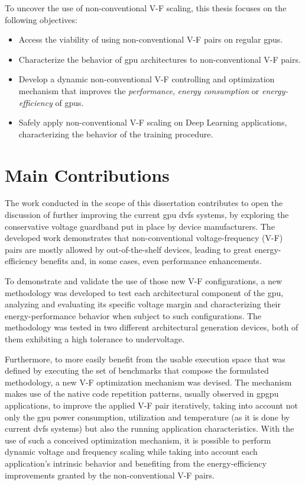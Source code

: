 To uncover the use of non-conventional V-F scaling, this thesis focuses on the following objectives:

\begin{itemize}
\item Access the viability of using non-conventional V-F pairs on regular \acrshort{gpu}s.
\item Characterize the behavior of \acrshort{gpu} architectures to non-conventional V-F pairs.
\item Develop a dynamic non-conventional V-F controlling and optimization mechanism that improves the \textit{performance}, \textit{energy consumption} or \textit{energy-efficiency} of \acrshort{gpu}s.
\item Safely apply non-conventional V-F scaling on Deep Learning applications, characterizing the behavior of the training procedure.
\end{itemize}


\section{Main Contributions}
\label{section:main_contri}

The work conducted in the scope of this dissertation contributes to open the discussion of further improving the current \acrshort{gpu} \acrshort{dvfs} systems, by exploring the conservative voltage guardband put in place by device manufacturers. The developed work demonstrates that non-conventional voltage-frequency (V-F) pairs are mostly allowed by out-of-the-shelf devices, leading to great energy-efficiency benefits and, in some cases, even performance enhancements. 

To demonstrate and validate the use of those new V-F configurations, a new methodology was developed to test each architectural component of the \acrshort{gpu}, analyzing and evaluating its specific voltage margin and characterizing their energy-performance behavior when subject to such configurations. The methodology was tested in two different architectural generation devices, both of them exhibiting a high tolerance to undervoltage.

Furthermore, to more easily benefit from the usable execution space that was defined by executing the set of benchmarks that compose the formulated methodology, a new V-F optimization mechanism was devised. The mechanism makes use of the native code repetition patterns, usually observed in \acrshort{gpgpu} applications, to improve the applied V-F pair iteratively, taking into account not only the \acrshort{gpu} power consumption, utilization and temperature (as it is done by current \acrshort{dvfs} systems) but also the running application characteristics. With the use of such a conceived optimization mechanism, it is possible to perform dynamic voltage and frequency scaling while taking into account each application's intrinsic behavior and benefiting from the energy-efficiency improvements granted by the non-conventional V-F pairs.

